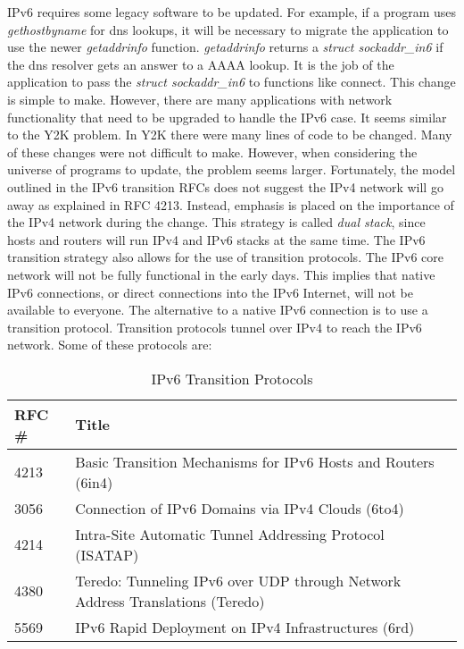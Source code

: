 IPv6 requires some legacy software to be updated.  For example,
if a program uses \textit{gethostbyname} for dns lookups, it
will be necessary to migrate the application to use the newer
\textit{getaddrinfo} function.  \textit{getaddrinfo} returns a
\textit{struct sockaddr\_in6} if the dns resolver gets an answer
to a AAAA lookup.  It is the job of the application to pass the
\textit{struct sockaddr\_in6} to functions like connect.  This change
is simple to make.  However, there are many applications with network
functionality that need to be upgraded to handle the IPv6 case.
It seems similar to the Y2K problem.  In Y2K there were many lines
of code to be changed.  Many of these changes were not difficult
to make.  However, when considering the universe of programs to
update, the problem seems larger.  Fortunately, the model outlined in
the IPv6 transition RFCs does not suggest the IPv4 network will go
away as explained in RFC 4213.  Instead, emphasis is placed on the importance
of the IPv4 network during the change.  This strategy is called
\textit{dual stack}, since hosts and routers will run IPv4 and IPv6
stacks at the same time.  The IPv6 transition strategy also allows
for the use of transition protocols.  The IPv6 core network will
not be fully functional in the early days.  This implies that
native IPv6 connections, or direct connections into the IPv6
Internet, will not be available to everyone.  The alternative
to a native IPv6 connection is to use a transition protocol.
Transition protocols tunnel over IPv4 to reach the IPv6 network.
Some of these protocols are:

 \begin{table}[htp]
\begin{center}
 \begin{tabular}{|l|p{4in}|}
   \hline
   \textbf{RFC \#} & \textbf{Title} \\
   \hline
   4213 & Basic Transition Mechanisms for IPv6 Hosts and Routers (6in4)\\
   \hline
   3056 & Connection of IPv6 Domains via IPv4 Clouds (6to4)\\
   \hline
   4214 & Intra-Site Automatic Tunnel Addressing Protocol (ISATAP)\\
   \hline   
   4380 & Teredo: Tunneling IPv6 over UDP through Network Address Translations (Teredo) \\
   \hline
   5569 & IPv6 Rapid Deployment on IPv4 Infrastructures (6rd)\\
   \hline
  \end{tabular}
 \caption{IPv6 Transition Protocols}
\end{center}
 \end{table}

